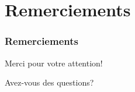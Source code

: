 \documentclass[12pt]{beamer}
\begin{document}
	\section*{Remerciements}
	\begin{frame}
	\frametitle{Remerciements}
		\begin{center}
		Merci pour votre attention!

		\bigbreak
		Avez-vous des questions?
		\end{center}
	\end{frame}
	
\end{document}
